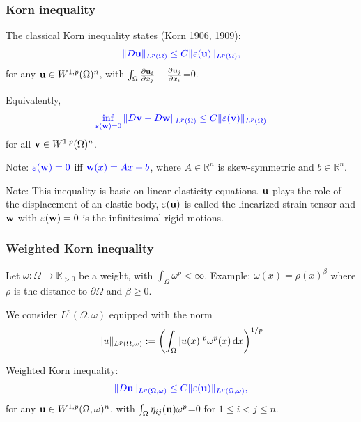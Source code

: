 \documentclass[small,xcolor=svgnames]{beamer}
\def\d{{\rm d}}
\def\o{\omega}
\def\O{\Omega}
\def\R{{\mathbb R}}
\def\uu{{\bf u}}
\def\vv{{\bf v}}
\def\w{\omega}
\def\ww{{\bf w}}
\def\c{\color{blue}}
\begin{document}
\begin{frame}\frametitle{Korn inequality}

The classical \underline{Korn inequality} states (Korn 1906, 1909):
\[{\c \|D\uu\|_{L^p(\O)}\leq C\|\varepsilon(\uu)\|_{L^p(\O)},}\]
for any $\uu\in W^{1,p}(\O)^n$, with $\int_\O \frac{\partial \uu_i}{\partial x_j}-\frac{\partial \uu_j}{\partial x_i}$=0. 

\bigskip

Equivalently,
\[{\c\inf_{\varepsilon(\ww)=0}\|D\vv-D\ww\|_{L^p(\O)}\leq C \|\varepsilon(\vv)\|_{L^p(\O)}}\] 
for all $\vv\in W^{1,p}(\O)^n$. 

\bigskip

Note: ${\c\varepsilon(\ww)=0}$ iff ${\c\ww(x)=Ax+b}$, where $A\in\R^n$ is skew-symmetric and $b\in \R^n$.

Note: This inequality is basic on linear elasticity equations. $\uu$ plays the role of the displacement of an elastic body, $\varepsilon(\uu)$ is called the linearized strain tensor and $\ww$ with $\varepsilon(\ww)=0$ is the infinitesimal rigid motions.

\end{frame}





\begin{frame}\frametitle{Weighted Korn inequality}

Let $\omega:\Omega\to\R_{>0}$ be a weight, with {\c $\int_\O \o^p<\infty$}. Example: $\w(x)=\rho(x)^\beta$ where $\rho$ is the distance to $\partial\O$ and $\beta \geq 0$.

We consider $L^p(\O,\o)$ equipped with the norm
\[\|u\|_{L^p(\Omega,\w)}:=\left(\int_\Omega|u(x)|^p\w^p(x)\,\d x\right)^{1/p}\]

\bigskip

\underline{Weighted Korn inequality}:
\[{\c \|D\uu\|_{L^p(\O,\o)}\leq C\|\varepsilon(\uu)\|_{L^p(\O,\o)},}\]
for any $\uu\in W^{1,p}(\O,\o)^n$, with $\int_\O \eta_{ij}(\uu)\o^p$=0 for $1\leq i<j\leq n$.


\end{frame}





\end{document}
